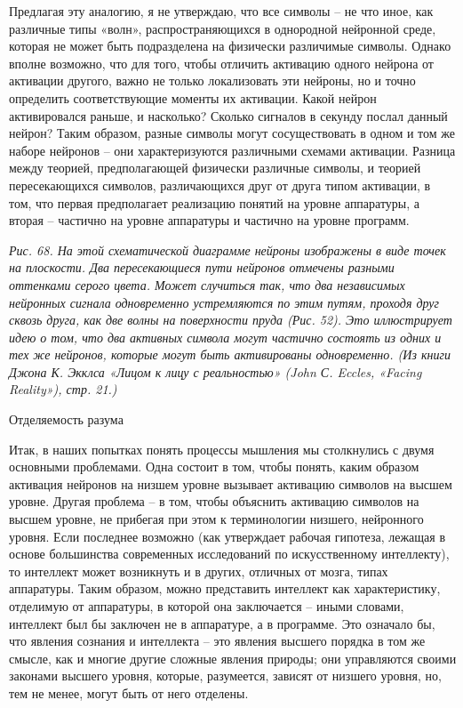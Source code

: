 \documentclass[../main.tex]{subfiles}
\begin{document}
Предлагая эту аналогию, я не утверждаю, что все символы \--- не что иное, как различные типы «волн», распространяющихся в однородной нейронной среде, которая не может быть подразделена на физически различимые символы. Однако вполне возможно, что для того, чтобы отличить активацию одного нейрона от активации другого, важно не только локализовать эти нейроны, но и точно определить соответствующие моменты их активации. Какой нейрон активировался раньше, и насколько? Сколько сигналов в секунду послал данный нейрон? Таким образом, разные символы могут сосуществовать в одном и том же наборе нейронов \--- они характеризуются различными схемами активации. Разница между теорией, предполагающей физически различные символы, и теорией пересекающихся символов, различающихся друг от друга типом активации, в том, что первая предполагает реализацию понятий на уровне аппаратуры, а вторая \--- частично на уровне аппаратуры и частично на уровне программ.

\emph{Рис. 68. На этой схематической диаграмме нейроны изображены в виде точек на плоскости. Два пересекающиеся пути нейронов отмечены разными оттенками серого цвета. Может случиться так, что два независимых нейронных сигнала одновременно устремляются по этим путям, проходя друг сквозь друга, как две волны на поверхности пруда (Рис. 52). Это иллюстрирует идею о том, что два активных символа могут частично состоять из одних и тех же нейронов, которые могут быть активированы одновременно. (Из книги Джона К. Экклса «Лицом к лицу с реальностью» (John С. Eccles, «Facing Reality»), стр. 21.)}

Отделяемость разума

Итак, в наших попытках понять процессы мышления мы столкнулись с двумя основными проблемами. Одна состоит в том, чтобы понять, каким образом активация нейронов на низшем уровне вызывает активацию символов на высшем уровне. Другая проблема \--- в том, чтобы объяснить активацию символов на высшем уровне, не прибегая при этом к терминологии низшего, нейронного уровня. Если последнее возможно (как утверждает рабочая гипотеза, лежащая в основе большинства современных исследований по искусственному интеллекту), то интеллект может возникнуть и в других, отличных от мозга, типах аппаратуры. Таким образом, можно представить интеллект как характеристику, отделимую от аппаратуры, в которой она заключается \--- иными словами, интеллект был бы заключен не в аппаратуре, а в программе. Это означало бы, что явления сознания и интеллекта \--- это явления высшего порядка в том же смысле, как и многие другие сложные явления природы; они управляются своими законами высшего уровня, которые, разумеется, зависят от низшего уровня, но, тем не менее, могут быть от него отделены.
\end{document}
